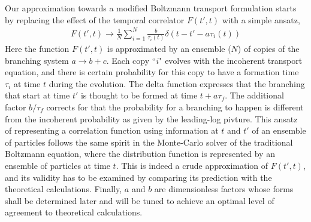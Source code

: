 \documentclass[aps, prc, reprint, amsmath, groupedaddress, nofootinbib]{revtex4-1}
\begin{document}
Our approximation towards a modified Boltzmann transport formulation starts by replacing the effect of the temporal correlator $F(t',t)$ with a simple ansatz,
\begin{eqnarray}
F(t', t) \rightarrow \frac{1}{N}\sum_{i=1}^N \frac{b}{\tau_i(t)} \delta(t-t'- a \tau_i(t))
\end{eqnarray}
Here the function $F(t', t)$ is approximated by an ensemble ($N$) of copies of the branching system $a\rightarrow b+c$.
Each copy ``$i$" evolves with the incoherent transport equation, and there is certain probability for this copy to have a formation time $\tau_i$ at time $t$ during the evolution.
The delta function expresses that the branching that start at time $t'$  is thought to be formed at time $t+a\tau_f$.
The additional factor $b/\tau_f$ corrects for that the probability for a branching to happen is different from the incoherent probability as given by the leading-log pivture.
This ansatz of representing a correlation function using information at $t$ and $t'$ of an ensemble of particles follows the same spirit in the Monte-Carlo solver of the traditional Boltzmann equation, where the distribution function is represented by an ensemble of particles at time $t$.
This is indeed a crude approximation of $F(t', t)$, and its validity has to be examined by comparing its prediction with the theoretical calculations.
Finally, $a$ and $b$ are dimensionless factors whose forms shall be determined later and will be tuned to achieve an optimal level of agreement to theoretical calculations.
\end{document}
